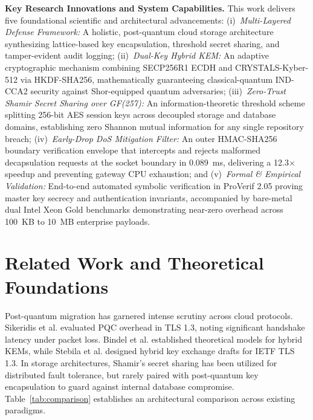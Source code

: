 \documentclass{llncs}
\begin{document}
\noindent\textbf{Key Research Innovations and System Capabilities.} This work delivers five foundational scientific and architectural advancements: (i)~\emph{Multi-Layered Defense Framework:} A holistic, post-quantum cloud storage architecture synthesizing lattice-based key encapsulation, threshold secret sharing, and tamper-evident audit logging; (ii)~\emph{Dual-Key Hybrid KEM:} An adaptive cryptographic mechanism combining SECP256R1 ECDH and CRYSTALS-Kyber-512 via HKDF-SHA256, mathematically guaranteeing classical-quantum IND-CCA2 security against Shor-equipped quantum adversaries; (iii)~\emph{Zero-Trust Shamir Secret Sharing over GF(257):} An information-theoretic threshold scheme splitting 256-bit AES session keys across decoupled storage and database domains, establishing zero Shannon mutual information for any single repository breach; (iv)~\emph{Early-Drop DoS Mitigation Filter:} An outer HMAC-SHA256 boundary verification envelope that intercepts and rejects malformed decapsulation requests at the socket boundary in 0.089~ms, delivering a 12.3$\times$ speedup and preventing gateway CPU exhaustion; and (v)~\emph{Formal \& Empirical Validation:} End-to-end automated symbolic verification in ProVerif 2.05 proving master key secrecy and authentication invariants, accompanied by bare-metal dual Intel Xeon Gold benchmarks demonstrating near-zero overhead across 100~KB to 10~MB enterprise payloads.

\section{Related Work and Theoretical Foundations}
Post-quantum migration has garnered intense scrutiny across cloud protocols. Sikeridis et al. \cite{sikeridis2020assessing} evaluated PQC overhead in TLS 1.3, noting significant handshake latency under packet loss. Bindel et al. \cite{bindel2019hybrid} established theoretical models for hybrid KEMs, while Stebila et al. \cite{stebila2023hybrid,stebila2016post} designed hybrid key exchange drafts for IETF TLS 1.3. In storage architectures, Shamir's secret sharing \cite{shamir1979share} has been utilized for distributed fault tolerance, but rarely paired with post-quantum key encapsulation to guard against internal database compromise. Table~\ref{tab:comparison} establishes an architectural comparison across existing paradigms.
\end{document}
